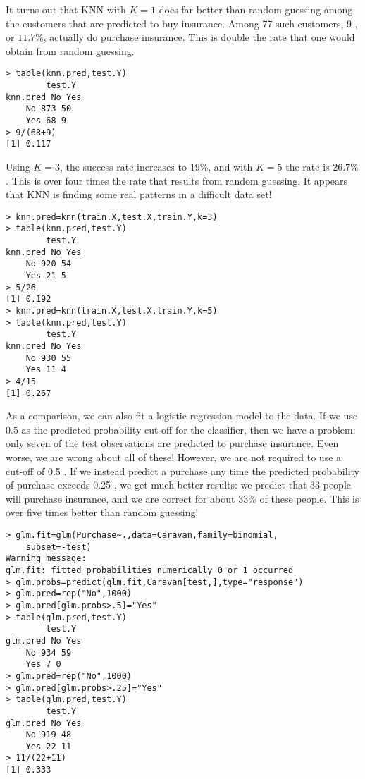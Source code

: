 \documentclass[10pt]{article}
\begin{document}
It turns out that KNN with $K=1$ does far better than random guessing among the customers that are predicted to buy insurance. Among 77 such customers, 9 , or $11.7 \%$, actually do purchase insurance. This is double the rate that one would obtain from random guessing.

\begin{verbatim}
> table(knn.pred,test.Y)
        test.Y
knn.pred No Yes
    No 873 50
    Yes 68 9
> 9/(68+9)
[1] 0.117
\end{verbatim}

Using $K=3$, the success rate increases to $19 \%$, and with $K=5$ the rate is $26.7 \%$. This is over four times the rate that results from random guessing. It appears that KNN is finding some real patterns in a difficult data set!


\begin{verbatim}
> knn.pred=knn(train.X,test.X,train.Y,k=3)
> table(knn.pred,test.Y)
        test.Y
knn.pred No Yes
    No 920 54
    Yes 21 5
> 5/26
[1] 0.192
> knn.pred=knn(train.X,test.X,train.Y,k=5)
> table(knn.pred,test.Y)
        test.Y
knn.pred No Yes
    No 930 55
    Yes 11 4
> 4/15
[1] 0.267
\end{verbatim}

As a comparison, we can also fit a logistic regression model to the data. If we use 0.5 as the predicted probability cut-off for the classifier, then we have a problem: only seven of the test observations are predicted to purchase insurance. Even worse, we are wrong about all of these! However, we are not required to use a cut-off of 0.5 . If we instead predict a purchase any time the predicted probability of purchase exceeds 0.25 , we get much better results: we predict that 33 people will purchase insurance, and we are correct for about $33 \%$ of these people. This is over five times better than random guessing!

\begin{verbatim}
> glm.fit=glm(Purchase~.,data=Caravan,family=binomial,
    subset=-test)
Warning message:
glm.fit: fitted probabilities numerically 0 or 1 occurred
> glm.probs=predict(glm.fit,Caravan[test,],type="response")
> glm.pred=rep("No",1000)
> glm.pred[glm.probs>.5]="Yes"
> table(glm.pred,test.Y)
        test.Y
glm.pred No Yes
    No 934 59
    Yes 7 0
> glm.pred=rep("No",1000)
> glm.pred[glm.probs>.25]="Yes"
> table(glm.pred,test.Y)
        test.Y
glm.pred No Yes
    No 919 48
    Yes 22 11
> 11/(22+11)
[1] 0.333
\end{verbatim}
\end{document}
